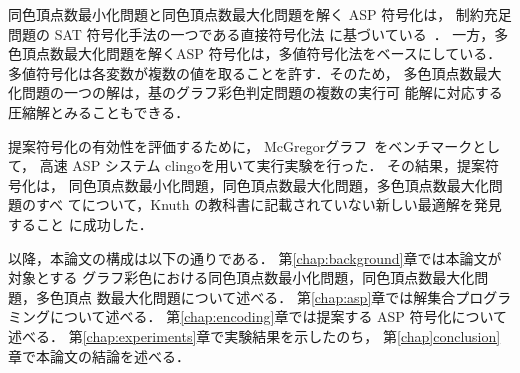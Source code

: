 同色頂点数最小化問題と同色頂点数最大化問題を解く ASP 符号化は，
制約充足問題の SAT 符号化手法の一つである直接符号化法
に基づいている~\cite{JSAI:TamuraTB10}．
一方，多色頂点数最大化問題を解くASP 符号化は，多値符号化法をベースにしている．
多値符号化は各変数が複数の値を取ることを許す．そのため，
多色頂点数最大化問題の一つの解は，基のグラフ彩色判定問題の複数の実行可
能解に対応する圧縮解とみることもできる．

提案符号化の有効性を評価するために，
\textsf{McGregor}グラフ~\cite{Knuth:TAOCP:SAT}をベンチマークとして，
高速 ASP システム \textsf{clingo}を用いて実行実験を行った．
その結果，提案符号化は，
同色頂点数最小化問題，同色頂点数最大化問題，多色頂点数最大化問題のすべ
てについて，Knuth の教科書に記載されていない新しい最適解を発見すること
に成功した．




以降，本論文の構成は以下の通りである．
第\ref{chap:background}章では本論文が対象とする
グラフ彩色における同色頂点数最小化問題，同色頂点数最大化問題，多色頂点
数最大化問題について述べる．
第\ref{chap:asp}章では解集合プログラミングについて述べる．
第\ref{chap:encoding}章では提案する ASP 符号化について述べる．
第\ref{chap:experiments}章で実験結果を示したのち，
第\ref{chap]conclusion}章で本論文の結論を述べる．

